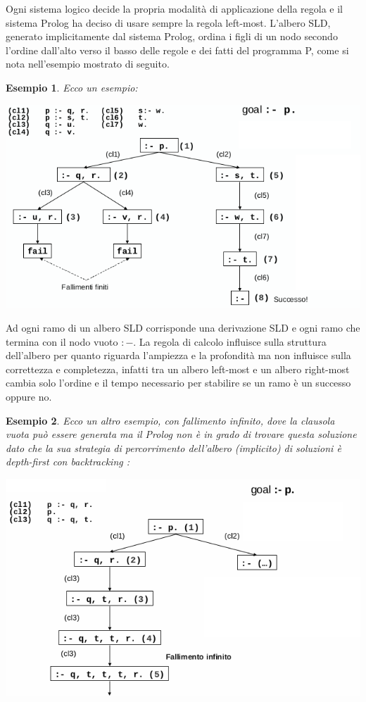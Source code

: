 \documentclass[a4paper]{book}
\newtheorem*{esempio}{Esempio}
\begin{document}
Ogni sistema logico decide la propria modalità di applicazione della regola e il sistema Prolog ha deciso di
usare sempre la regola left-most.\newline
L'albero SLD, generato implicitamente dal sistema Prolog, ordina i figli di un nodo secondo l'ordine dall'alto verso il basso
delle regole e dei fatti del programma P, come si nota nell'esempio mostrato di seguito.
\begin{esempio}
Ecco un esempio:
\begin{center}
\includegraphics[scale=0.7]{img/alb.png}
\end{center}
\end{esempio}
Ad ogni ramo di un albero SLD corrisponde una derivazione SLD e ogni ramo che termina con il nodo vuoto $:-$.\newline
La regola di calcolo influisce sulla struttura dell'albero per quanto riguarda l'ampiezza e la profondità ma non influisce
sulla correttezza e completezza, infatti tra un albero left-most e un albero right-most cambia solo l'ordine e il tempo necessario
per stabilire se un ramo è un successo oppure no.
\begin{esempio}
  Ecco un altro esempio, con fallimento infinito, dove la clausola vuota può essere generata ma il Prolog non è in grado di trovare
  questa soluzione dato che la sua strategia di percorrimento dell’albero (implicito) di soluzioni è depth-first con backtracking :
\begin{center}
\includegraphics[scale=0.7]{img/alb2.png}
\end{center}
\end{esempio}
\end{document}
